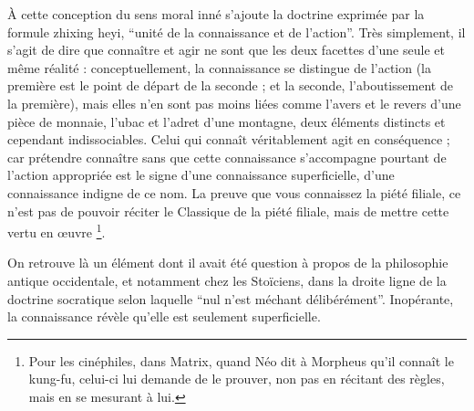 À cette conception du sens moral inné s'ajoute la doctrine exprimée par la formule
zhixing heyi, ``unité de la connaissance et de l'action''.
Très simplement, il s'agit de
dire que connaître et agir ne sont que les deux facettes d'une seule et même réalité :
conceptuellement, la connaissance se distingue de l'action (la première est le point de
départ de la seconde ; et la seconde, l'aboutissement de la première), mais elles n'en
sont pas moins liées comme l'avers et le revers d'une pièce de monnaie, l'ubac et l'adret
d'une montagne, deux éléments distincts et cependant indissociables.
Celui qui connaît
véritablement agit en conséquence ; car prétendre connaître sans que cette connaissance
s'accompagne pourtant de l'action appropriée est le signe d'une connaissance superficielle, d'une connaissance indigne de ce nom.
La preuve que vous connaissez la piété
filiale, ce n'est pas de pouvoir réciter le Classique de la piété filiale, mais de mettre
cette vertu en œuvre
\footnote{Pour les cinéphiles, dans Matrix, quand Néo dit à Morpheus
qu'il connaît le kung-fu, celui-ci lui demande de le prouver, non pas en récitant des règles, mais en se mesurant à lui.}.

On retrouve là un élément dont il avait été question à propos de la philosophie antique
occidentale, et notamment chez les Stoïciens, dans la droite ligne de la doctrine socratique selon laquelle ``nul n'est méchant délibérément''.
Inopérante, la connaissance
révèle qu'elle est seulement superficielle.

